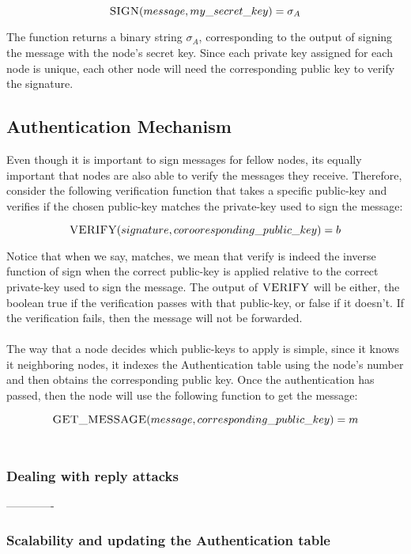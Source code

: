 \documentclass[letterpaper]{article}
\begin{document}
\begin{enumerate}
$$\textsc{SIGN}(message, my\_secret\_key) = \sigma_{A}$$

The function returns a binary string $\sigma_{A}$, corresponding to the output of signing the message with the node's secret key. Since each private key assigned for each node is unique, each other node will need the corresponding public key to verify the signature.

\subsection{Authentication Mechanism}
Even though it is important to sign messages for fellow nodes, its equally important that nodes are also able to verify the messages they receive. 
Therefore, consider the following verification function that takes a specific public-key and verifies if the chosen public-key matches the private-key used to sign the message:

$$\textsc{VERIFY}(signature, corooresponding\_public\_key) =  b $$

Notice that when we say, matches, we mean that verify is indeed the inverse function of sign when the correct public-key is applied relative to the correct private-key used to sign the message.
The output of $\textsc{VERIFY}$ will be either, the boolean true if the verification passes with that public-key, or false if it doesn't. If the verification fails, then the message will not be forwarded. 
\\
\\
The way that a node decides which public-keys to apply is simple, since it knows it neighboring nodes, it indexes the Authentication table using the node's number and then obtains the corresponding public key.
Once the authentication has passed, then the node will use the following function to get the message:

$$\textsc{GET\_MESSAGE}(message, corresponding\_public\_key) = m$$
\\

\subsubsection{Dealing with reply attacks }


-------------


\subsubsection{Scalability and updating the Authentication table}


\end{enumerate}
\end{document}
